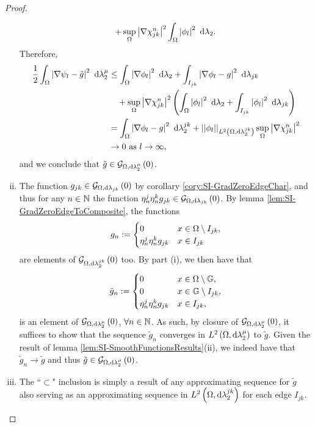 \begin{proof}
\begin{enumerate}[(i)]
\begin{align*}
			+ \sup_{\Omega}\left\lvert \nabla\chi_{jk}^n \right\rvert^2 \int_{\Omega}\left\lvert  \phi_l  \right\rvert^2 \ \mathrm{d}\lambda_2.
		\end{align*}
		Therefore,
		\begin{align*}
			\frac{1}{2}\int_{\Omega}\left\lvert  \nabla\psi_l - \tilde{g}  \right\rvert^2 \ \mathrm{d}\lambda_2^{\mu}
			&\leq \int_{\Omega}\left\lvert  \nabla\phi_l  \right\rvert^2 \ \mathrm{d}\lambda_2
			+ \int_{I_{jk}}\left\lvert  \nabla\phi_l - g  \right\rvert^2 \ \mathrm{d}\lambda_{jk} \\
			&\quad + \sup_{\Omega}\left\lvert \nabla\chi_{jk}^n \right\rvert^2 
			\left(  \int_{\Omega}\left\lvert  \phi_l  \right\rvert^2 \ \mathrm{d}\lambda_2 	+ \int_{I_{jk}}\left\lvert  \phi_l  \right\rvert^2 \ \mathrm{d}\lambda_{jk}  \right) \\
			&= \int_{\Omega}\left\lvert  \nabla\phi_l - g  \right\rvert^2 \ \mathrm{d}\lambda_2^{jk}
			+ \lvert\lvert \phi_l \rvert\rvert_{L^{2}\left( \Omega,\mathrm{d} \lambda_2^{jk} \right)} \sup_{\Omega}\left\lvert \nabla\chi_{jk}^n \right\rvert^2 \\
			&\rightarrow 0 \ \text{as} \ l \rightarrow\infty,
		\end{align*}
		and we conclude that $\tilde{g}\in\mathcal{G}_{ \Omega, \mathrm{d}\lambda_2^{\mu}}\left( 0 \right)$.
		\item The function $g_{jk}\in\mathcal{G}_{ \Omega, \mathrm{d}\lambda_{jk}}\left( 0 \right)$ by corollary \ref{cory:SI-GradZeroEdgeChar}, and thus for any $n\in\mathbb{N}$ the function $\eta_n^j\eta_n^k g_{jk}\in\mathcal{G}_{ \Omega, \mathrm{d}\lambda_{jk}}\left( 0 \right)$.
		By lemma \ref{lem:SI-GradZeroEdgeToComposite}, the functions
		\begin{align*}
			g_n := \begin{cases} 0 & x\in\Omega\setminus I_{jk}, \\ \eta_n^j\eta_n^k g_{jk} & x\in I_{jk} \end{cases}
		\end{align*}
		are elements of $\mathcal{G}_{ \Omega, \mathrm{d}\lambda_2^{jk}}\left( 0 \right)$ too.
		By part (i), we then have that
		\begin{align*}
			\tilde{g}_n := 	\begin{cases} 0 & x\in\Omega\setminus\mathbb{G}, \\ 0 & x\in\mathbb{G}\setminus I_{jk}, \\ \eta_n^j\eta_n^k g_{jk} & x\in I_{jk}, \end{cases}
		\end{align*}
		is an element of $\mathcal{G}_{ \Omega, \mathrm{d}\lambda_2^{\mu}}\left( 0 \right)$, $\forall n\in\mathbb{N}$.
		As such, by closure of $\mathcal{G}_{ \Omega, \mathrm{d}\lambda_2^{\mu}}\left( 0 \right)$, it suffices to show that the sequence $\tilde{g}_n$ converges in $L^{2}\left( \Omega,\mathrm{d} \lambda_2^{\mu} \right)$ to $\tilde{g}$.
		Given the result of lemma \ref{lem:SI-SmoothFunctionsResults}(ii), we indeed have that $\tilde{g}_n\rightarrow\tilde{g}$ and thus $\tilde{g}\in\mathcal{G}_{ \Omega, \mathrm{d}\lambda_2^{\mu}}\left( 0 \right)$.
		\item The ``$\subset$" inclusion is simply a result of any approximating sequence for $\tilde{g}$ also serving as an approximating sequence in $L^{2}\left( \Omega,\mathrm{d} \lambda_2^{jk} \right)$ for each edge $I_{jk}$. \newline

\end{enumerate}
\end{proof}
